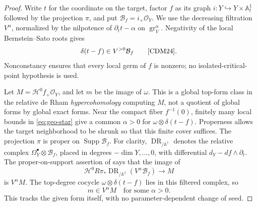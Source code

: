 \begin{proof}
Write \(t\) for the coordinate on the target, factor \(f\) as its graph
\(i:Y\hookrightarrow Y\times\mathbb A^1_t\) followed by the projection
\(\pi\), and put \(\mathcal B_f=i_+\mathcal O_Y\).
We use the decreasing filtration \(V^\alpha\), normalized by the
nilpotence of \(\partial_t t-\alpha\) on \(\operatorname{gr}_V^\alpha\).
Negativity of the local Bernstein--Sato roots
\cite[Corollary~5.2]{Kas76} gives
\begin{equation}\label{eq:geo-star}
\delta(t-f)\in V^{>0}\mathcal B_f
 \qquad\text{\cite[Corollary~5.15 and Example~5.19]{CDM24}}.
\end{equation}
Nonconstancy ensures that every local germ of \(f\) is nonzero; no
isolated-critical-point hypothesis is used.

Let \(M=\mathcal H^0f_+\mathcal O_Y\), and let \(m\) be the image of
\(\omega\). This is a global top-form class in the relative de Rham
\emph{hypercohomology} computing \(M\), not a quotient of global forms
by global exact forms. Near the compact fiber \(f^{-1}(0)\), finitely
many local bounds in \eqref{eq:geo-star} give a common \(\alpha>0\) for
\(\omega\otimes\delta(t-f)\). Properness allows the target neighborhood
to be shrunk so that this finite cover suffices. The projection \(\pi\)
is proper on \(\operatorname{Supp}\mathcal B_f\).
For clarity, \(\operatorname{DR}_{/\mathbb A^1}\) denotes the relative
complex \(\Omega_Y^\bullet\otimes\mathcal B_f\), placed in degrees
\(-\dim Y,\ldots,0\), with differential
\(d_Y-df\wedge\partial_t\). The proper-on-support assertion of
\cite[Theorem~8.1]{CDM24} says that the image of
\[
 \mathcal H^0R\pi_*\operatorname{DR}_{/\mathbb A^1}
       (V^\alpha\mathcal B_f)\longrightarrow M
\]
is \(V^\alpha M\). The top-degree cocycle
\(\omega\otimes\delta(t-f)\) lies in this filtered complex, so
\begin{equation}\label{eq:geo-starstar}
m\in V^\alpha M\quad\text{for some }\alpha>0.
\end{equation}
This tracks the given form itself, with no parameter-dependent change
of seed.


\end{proof}
